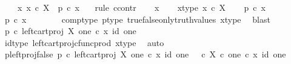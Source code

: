 \begin{isabellebody}
\ \ \ {\isachardoublequoteopen}{\isasymAnd}\ x{\isachardot}{\kern0pt}\ x\ {\isasymin}\isactrlsub c\ X\ {\isasymLongrightarrow}\ p\ {\isasymcirc}\isactrlsub c\ x\ {\isacharequal}{\kern0pt}\ {\isasymt}{\isachardoublequoteclose}\isanewline
%
\isadelimproof
%
\endisadelimproof
%
\isatagproof
{}\isamarkupfalse%
\ {\isacharparenleft}{\kern0pt}rule\ ccontr{\isacharparenright}{\kern0pt}\isanewline
\ \ \isamarkupfalse%
\ x\isanewline
\ \ \isamarkupfalse%
\ x{\isacharunderscore}{\kern0pt}type{\isacharcolon}{\kern0pt}\ {\isachardoublequoteopen}x\ {\isasymin}\isactrlsub c\ X{\isachardoublequoteclose}\isanewline
\ \ \isamarkupfalse%
\ {\isachardoublequoteopen}p\ {\isasymcirc}\isactrlsub c\ x\ {\isasymnoteq}\ {\isasymt}{\isachardoublequoteclose}\isanewline
\ \ \isamarkupfalse%
\ \isamarkupfalse%
\ {\isachardoublequoteopen}p\ {\isasymcirc}\isactrlsub c\ x\ {\isacharequal}{\kern0pt}\ {\isasymf}{\isachardoublequoteclose}\isanewline
\ \ \ \ \isamarkupfalse%
\ comp{\isacharunderscore}{\kern0pt}type\ p{\isacharunderscore}{\kern0pt}type\ true{\isacharunderscore}{\kern0pt}false{\isacharunderscore}{\kern0pt}only{\isacharunderscore}{\kern0pt}truth{\isacharunderscore}{\kern0pt}values\ x{\isacharunderscore}{\kern0pt}type\ \isamarkupfalse%
\ blast\isanewline
\ \ \isamarkupfalse%
\ \isamarkupfalse%
\ {\isachardoublequoteopen}p\ {\isasymcirc}\isactrlsub c\ left{\isacharunderscore}{\kern0pt}cart{\isacharunderscore}{\kern0pt}proj\ X\ one\ {\isasymcirc}\isactrlsub c\ {\isasymlangle}x{\isacharcomma}{\kern0pt}\ id\ one{\isasymrangle}\ {\isacharequal}{\kern0pt}\ {\isasymf}{\isachardoublequoteclose}\isanewline
\ \ \ \ \isamarkupfalse%
\ id{\isacharunderscore}{\kern0pt}type\ left{\isacharunderscore}{\kern0pt}cart{\isacharunderscore}{\kern0pt}proj{\isacharunderscore}{\kern0pt}cfunc{\isacharunderscore}{\kern0pt}prod\ x{\isacharunderscore}{\kern0pt}type\ \isamarkupfalse%
\ auto\isanewline
\ \ \isamarkupfalse%
\ \isamarkupfalse%
\ p{\isacharunderscore}{\kern0pt}left{\isacharunderscore}{\kern0pt}proj{\isacharunderscore}{\kern0pt}false{\isacharcolon}{\kern0pt}\ {\isachardoublequoteopen}p\ {\isasymcirc}\isactrlsub c\ left{\isacharunderscore}{\kern0pt}cart{\isacharunderscore}{\kern0pt}proj\ X\ one\ {\isasymcirc}\isactrlsub c\ {\isasymlangle}x{\isacharcomma}{\kern0pt}\ id\ one{\isasymrangle}\ {\isacharequal}{\kern0pt}\ {\isasymf}\ {\isasymcirc}\isactrlsub c\ {\isasymbeta}\isactrlbsub X\ {\isasymtimes}\isactrlsub c\ one\isactrlesub \ {\isasymcirc}\isactrlsub c\ {\isasymlangle}x{\isacharcomma}{\kern0pt}\ id\ one{\isasymrangle}{\isachardoublequoteclose}\isanewline

\end{isabellebody}
